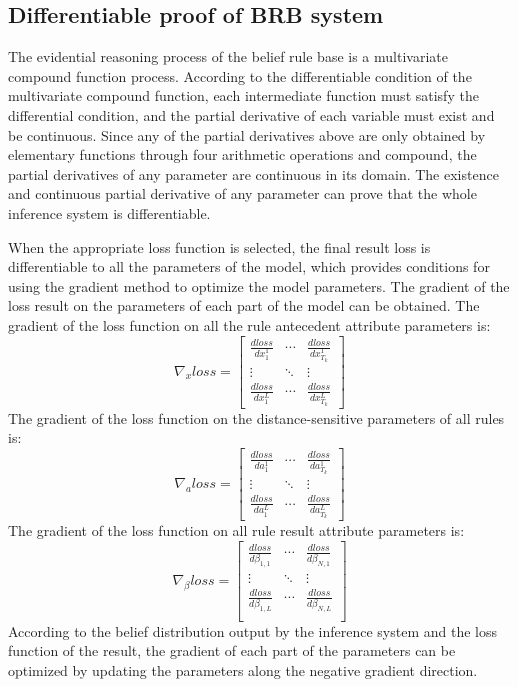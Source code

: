 \documentclass{ieeeaccess}
\begin{document}
\subsection{Differentiable proof of BRB system}
The evidential reasoning process of the belief rule base is a multivariate compound function process. According to the differentiable condition of the multivariate compound function, each intermediate function must satisfy the differential condition,
and the partial derivative of each variable must exist and be continuous.
Since any of the partial derivatives above are only obtained by elementary functions through four arithmetic operations and compound,
the partial derivatives of any parameter are continuous in its domain.
The existence and continuous partial derivative of any parameter can prove that the whole inference system is differentiable.

When the appropriate loss function is selected, the final result loss is differentiable to all the parameters of the model, which provides conditions for using the gradient method to optimize the model parameters.
The gradient of the loss result on the parameters of each part of the model can be obtained. The gradient of the loss function on all the rule antecedent attribute parameters is:
$$\nabla_{x}loss=\left[\begin{matrix}
            \frac{dloss}{dx_1^1} & \cdots & \frac{dloss}{dx_{T_k}^1} \\
            \vdots               & \ddots & \vdots                   \\
            \frac{dloss}{dx_1^L} & \cdots & \frac{dloss}{dx_{T_k}^L}
        \end{matrix}\right]$$
The gradient of the loss function on the distance-sensitive parameters of all rules is:
$$\nabla_{a}loss=\left[\begin{matrix}
            \frac{dloss}{da_1^1} & \cdots & \frac{dloss}{da_{T_k}^1} \\
            \vdots               & \ddots & \vdots                   \\
            \frac{dloss}{da_1^L} & \cdots & \frac{dloss}{da_{T_k}^L}
        \end{matrix}\right]$$
The gradient of the loss function on all rule result attribute parameters is:
$$\nabla_{\beta}loss=\left[\begin{matrix}
            \frac{dloss}{d\beta_{1,1}} & \cdots & \frac{dloss}{d\beta_{N,1}} \\
            \vdots                     & \ddots & \vdots                     \\
            \frac{dloss}{d\beta_{1,L}} & \cdots & \frac{dloss}{d\beta_{N,L}} \\
        \end{matrix}\right]$$
According to the belief distribution output by the inference system and the loss function of the result,
the gradient of each part of the parameters can be optimized by updating the parameters along the negative gradient direction.
\end{document}
